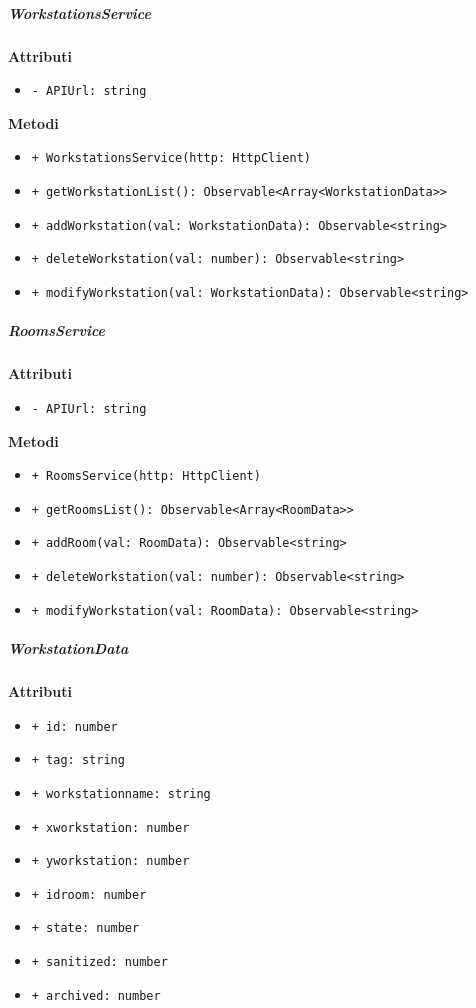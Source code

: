 \subparagraph{WorkstationsService}
\textbf{Attributi}
\begin{itemize}
	\item \texttt{- APIUrl: string}
\end{itemize}
\textbf{Metodi}
\begin{itemize}
	\item \texttt{+ WorkstationsService(http: HttpClient) 	}
	\item \texttt{+ getWorkstationList(): Observable<Array<WorkstationData>> 	}
	\item \texttt{+ addWorkstation(val: WorkstationData): Observable<string> 	}
	\item \texttt{+ deleteWorkstation(val: number): Observable<string> 	}
	\item \texttt{+ modifyWorkstation(val: WorkstationData): Observable<string>}
\end{itemize}
\subparagraph{RoomsService}
\textbf{Attributi}
\begin{itemize}
	\item \texttt{- APIUrl: string}
\end{itemize}
\textbf{Metodi}
\begin{itemize}
	\item \texttt{+ RoomsService(http: HttpClient) 	}
	\item \texttt{+ getRoomsList(): Observable<Array<RoomData>> 	}
	\item \texttt{+ addRoom(val: RoomData): Observable<string> 	}
	\item \texttt{+ deleteWorkstation(val: number): Observable<string> 	}
	\item \texttt{+ modifyWorkstation(val: RoomData): Observable<string>}
\end{itemize}
\subparagraph{WorkstationData}
\textbf{Attributi}
\begin{itemize}
	\item \texttt{+ id: number 	}
	\item \texttt{+ tag: string 	}
	\item \texttt{+ workstationname: string 	}
	\item \texttt{+ xworkstation: number 	}
	\item \texttt{+ yworkstation: number 	}
	\item \texttt{+ idroom: number 	}
	\item \texttt{+ state: number 	}
	\item \texttt{+ sanitized: number 	}
	\item \texttt{+ archived: number}
\end{itemize}
